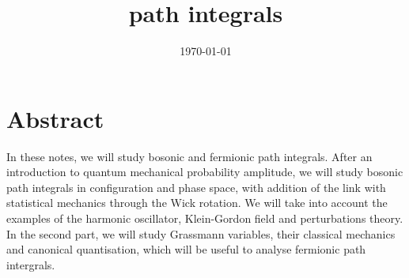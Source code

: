\documentclass[a4paper, 12pt]{memoir}
\title{path integrals}
\date{\today}
\begin{document}
\frontmatter



\tableofcontents

\mainmatter



\chapter*{Abstract}

    In these notes, we will study bosonic and fermionic path integrals. After an introduction to quantum mechanical probability amplitude, we will study bosonic path integrals in configuration and phase space, with addition of the link with statistical mechanics through the Wick rotation. We will take into account the examples of the harmonic oscillator, Klein-Gordon field and perturbations theory. In the second part, we will study Grassmann variables, their classical mechanics and canonical quantisation, which will be useful to analyse fermionic path intergrals.
    



\backmatter

\nocite{rqmlecture2}

\clearpage
{}
\printbibliography
\end{document}

